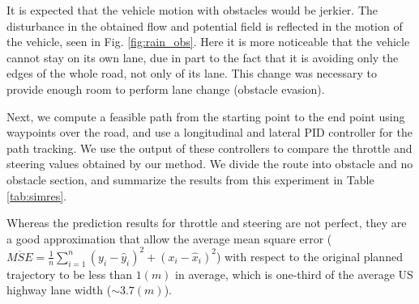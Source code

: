 \documentclass[letterpaper, 10 pt, conference]{ieeeconf}  %
\begin{document}

It is expected that the vehicle motion with obstacles would be jerkier. The disturbance in the obtained flow and potential field is reflected in the motion of the vehicle, seen in Fig. \ref{fig:rain_obs}. Here it is more noticeable that the vehicle cannot stay on its own lane, due in part to the fact that it is avoiding only the edges of the whole road, not only of its lane. This change was necessary to provide enough room to perform lane change (obstacle evasion).

Next, we compute a feasible path from the starting point to the end point using waypoints over the road, and use a longitudinal and lateral PID controller for the path tracking. We use the output of these controllers to compare the throttle and steering values obtained by our method.
We divide the route into obstacle and no obstacle section, and summarize the results from this experiment in Table \ref{tab:simres}. 

Whereas the prediction results for throttle and steering are not perfect, they are a good approximation that allow the average mean square error ($\overline{MSE}=\frac{1}{n} \sum_{i=1}^n (y_i-\hat{y}_i)^2+(x_i-\hat{x}_i)^2$) with respect to the original planned trajectory to be less than $1 (m)$ in average, which is one-third of the average US highway lane width ($\sim 3.7 (m)$).
\end{document}
